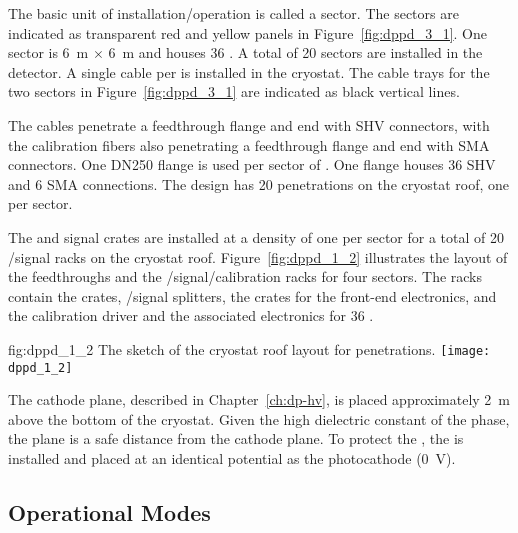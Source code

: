 The basic unit of installation/operation is called a sector. The sectors are indicated as transparent red and yellow panels in Figure~\ref{fig:dppd_3_1}. One \dual {} sector is \SI{6}{\m} $\times$ \SI{6}{\m} and houses \num{36} . A total of \num{20} sectors are installed in the detector. A single  cable per  is installed in the cryostat.
The cable trays for the two sectors in Figure~\ref{fig:dppd_3_1} are indicated as black vertical lines.


The  cables penetrate a feedthrough flange and end with SHV connectors, with the calibration fibers also penetrating a feedthrough flange and end with SMA connectors. One DN250 flange is used per sector of \dual {}. One flange houses \num{36} SHV and \num{6} SMA connections. The \dual {} design has \num{20} penetrations on the cryostat roof, one per sector. 

The  and signal crates are installed at a density of one per sector for a total of \num{20} /signal racks on the cryostat roof. Figure~\ref{fig:dppd_1_2} illustrates the layout of the feedthroughs and the /signal/calibration racks for four sectors. The racks contain the  crates, /signal splitters, the  crates for the front-end electronics, and the calibration  driver and the associated electronics for \num{36} .

\begin{dunefigure}{fig:dppd_1_2}
{The sketch of the cryostat roof layout for \dual {} penetrations.}
\texttt{[image: dppd\_1\_2]}
\end{dunefigure}

The cathode plane, described in Chapter~\ref{ch:dp-hv}, is placed approximately \SI{2}{m} above the bottom of the cryostat. Given the high dielectric constant of the  phase, the  plane is a safe distance from the cathode plane. To protect the , the  is installed and placed at an identical potential as the  photocathode (\SI{0}{V}).

\subsection{Operational Modes} %
\label{sec:dp-pds-oveerview_operation}

